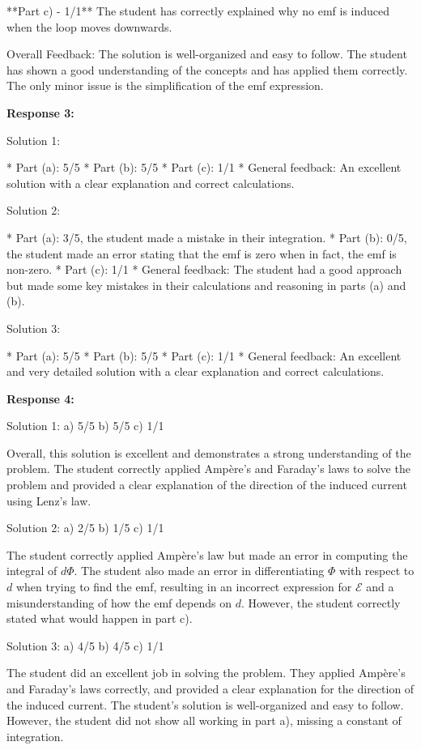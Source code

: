 \documentclass[a4paper,11pt]{article}
\begin{document}
**Part c) - 1/1**
The student has correctly explained why no emf is induced when the loop moves downwards.

Overall Feedback: The solution is well-organized and easy to follow. The student has shown a good understanding of the concepts and has applied them correctly. The only minor issue is the simplification of the emf expression.

\bigskip    
\textbf{Response 3:}

Solution 1:

* Part (a): 5/5
* Part (b): 5/5
* Part (c): 1/1
* General feedback: An excellent solution with a clear explanation and correct calculations.

Solution 2:

* Part (a): 3/5, the student made a mistake in their integration.
* Part (b): 0/5, the student made an error stating that the emf is zero when in fact, the emf is non-zero.
* Part (c): 1/1
* General feedback: The student had a good approach but made some key mistakes in their calculations and reasoning in parts (a) and (b). 

Solution 3:

* Part (a): 5/5
* Part (b): 5/5
* Part (c): 1/1
* General feedback: An excellent and very detailed solution with a clear explanation and correct calculations. 

\bigskip    
\textbf{Response 4:}

Solution 1:
a) 5/5
b) 5/5
c) 1/1

Overall, this solution is excellent and demonstrates a strong understanding of the problem. The student correctly applied Ampère's and Faraday's laws to solve the problem and provided a clear explanation of the direction of the induced current using Lenz's law.

Solution 2:
a) 2/5
b) 1/5
c) 1/1

The student correctly applied Ampère's law but made an error in computing the integral of \( d\Phi \). The student also made an error in differentiating \( \Phi \) with respect to \( d \) when trying to find the emf, resulting in an incorrect expression for \( \mathcal{E} \) and a misunderstanding of how the emf depends on \( d \). However, the student correctly stated what would happen in part c).

Solution 3:
a) 4/5
b) 4/5
c) 1/1

The student did an excellent job in solving the problem. They applied Ampère's and Faraday's laws correctly, and provided a clear explanation for the direction of the induced current. The student's solution is well-organized and easy to follow. However, the student did not show all working in part a), missing a constant of integration.
\end{document}
